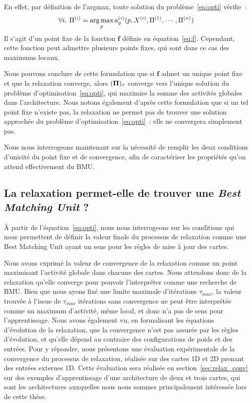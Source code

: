 \documentclass[../main]{subfiles}
\begin{document}
En effet, par définition de l'argmax, toute solution du problème~\ref{eq:opti} vérifie~:
$$\forall i, \: \Pi^{({i})} = \operatorname*{arg\,max}\limits_p a_g^{({i})}(p, X^{({i})}, \Pi^{({1})}, \cdots, \Pi^{({n})})$$
Il s'agit d'un point fixe de la fonction $\mathbf{f}$ définie en équation~\ref{eq:f}.
Cependant, cette fonction peut admettre plusieurs points fixes, qui sont dans ce cas des maximums locaux. 

Nous pouvons conclure de cette formulation que si $\mathbf{f}$ admet un unique point fixe et que la relaxation converge, alors $(\mathbf{\Pi})_\tau$ converge vers l'unique solution du problème d'optimisation~\ref{eq:opti}, qui maximise la somme des activités globales dans l'architecture.
Nous notons également d'après cette formulation que si un tel point fixe n'existe pas, la relaxation ne permet pas de trouver une solution approchée du problème d'optimisation~\ref{eq:opti}~: elle ne convergera simplement pas.

Nous nous interrogeons maintenant sur la nécessité de remplir les deux conditions d'unicité du point fixe et de convergence, afin de caractériser les propriétés qu'on attend effectivement du BMU.

\subsection{La relaxation permet-elle de trouver une \og \emph{Best Matching Unit} \fg{} ?}

\`A partir de l'équation~\ref{eq:opti}, nous nous interrogeons sur les conditions qui nous permettent de définir la valeur finale du processus de relaxation comme une \og Best Matching Unit \fg{} ayant un sens pour les règles de mise à jour des cartes.

Nous avons exprimé la valeur de convergence de la relaxation comme un point maximisant l'activité globale dans chacune des cartes. Nous attendons donc de la relaxation qu'elle converge pour pouvoir l'interpréter comme une recherche de BMU. 
Bien que nous ayons fixé une limite maximale d'itérations $\tau_{max}$, la valeur trouvée à l'issue de $\tau_{max}$ itérations sans convergence ne peut être interprétée comme un maximum d'activité, même local, et donc n'a pas de sens pour l'apprentissage. Nous avons également vu, en formalisant les équations d'évolution de la relaxation, que la convergence n'est pas assurée par les règles d'évolution, et qu'elle dépend au contraire des configurations de poids et des entrées.
Pour y répondre, nous présentons une évaluation expérimentale de la convergence du processus de relaxation, réalisée sur des cartes 1D et 2D prenant des entrées externes 1D.
Cette évaluation  sera réalisée en section~\ref{sec:relax_conv} sur des exemples d'apprentissage d'une architecture de deux et trois cartes, qui sont les architectures auxquelles nous nous sommes principalement intéressée lors de cette thèse.
\end{document}
